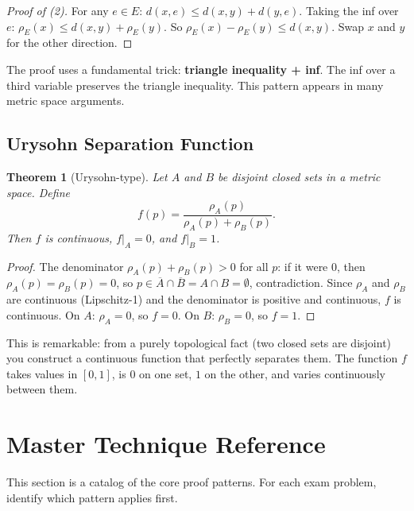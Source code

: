 \documentclass[11pt]{article}
\theoremstyle{myplain}
\newtheorem{theorem}{Theorem}[section]
\theoremstyle{definition}
\theoremstyle{remark}
\begin{document}
\begin{proof}[Proof of (2)]
For any $e \in E$: $d(x,e) \leq d(x,y) + d(y,e)$. Taking the inf over $e$: $\rho_E(x) \leq d(x,y) + \rho_E(y)$. So $\rho_E(x) - \rho_E(y) \leq d(x,y)$. Swap $x$ and $y$ for the other direction.
\end{proof}

\begin{insight}
The proof uses a fundamental trick: \textbf{triangle inequality + inf}. The inf over a third variable preserves the triangle inequality. This pattern appears in many metric space arguments.
\end{insight}

\subsection{Urysohn Separation Function}

\begin{theorem}[Urysohn-type]
Let $A$ and $B$ be disjoint closed sets in a metric space. Define
$$f(p) = \frac{\rho_A(p)}{\rho_A(p) + \rho_B(p)}.$$
Then $f$ is continuous, $f|_A = 0$, and $f|_B = 1$.
\end{theorem}

\begin{proof}
The denominator $\rho_A(p) + \rho_B(p) > 0$ for all $p$: if it were $0$, then $\rho_A(p) = \rho_B(p) = 0$, so $p \in \overline{A} \cap \overline{B} = A \cap B = \emptyset$, contradiction. Since $\rho_A$ and $\rho_B$ are continuous (Lipschitz-1) and the denominator is positive and continuous, $f$ is continuous. On $A$: $\rho_A = 0$, so $f = 0$. On $B$: $\rho_B = 0$, so $f = 1$.
\end{proof}

\begin{insight}
This is remarkable: from a purely topological fact (two closed sets are disjoint) you construct a continuous function that perfectly separates them. The function $f$ takes values in $[0,1]$, is $0$ on one set, $1$ on the other, and varies continuously between them.
\end{insight}

\section{Master Technique Reference}

This section is a catalog of the core proof patterns. For each exam problem, identify which pattern applies first.
\end{document}
